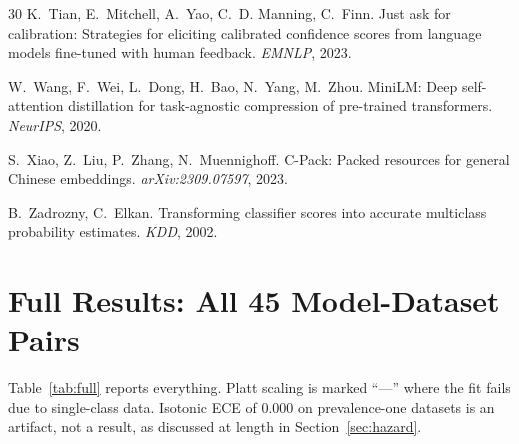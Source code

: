 \begin{thebibliography}{30}
 K.~Tian, E.~Mitchell, A.~Yao, C.~D. Manning, C.~Finn.
Just ask for calibration: Strategies for eliciting calibrated confidence scores
from language models fine-tuned with human feedback.
\emph{EMNLP}, 2023.

 W.~Wang, F.~Wei, L.~Dong, H.~Bao, N.~Yang, M.~Zhou.
MiniLM: Deep self-attention distillation for task-agnostic compression of
pre-trained transformers.
\emph{NeurIPS}, 2020.

 S.~Xiao, Z.~Liu, P.~Zhang, N.~Muennighoff.
C-Pack: Packed resources for general Chinese embeddings.
\emph{arXiv:2309.07597}, 2023.

 B.~Zadrozny, C.~Elkan.
Transforming classifier scores into accurate multiclass probability estimates.
\emph{KDD}, 2002.

\end{thebibliography}

\clearpage
\appendix
\section{Full Results: All 45 Model-Dataset Pairs}
\label{app:full}

Table~\ref{tab:full} reports everything. Platt scaling is marked ``---'' where the
fit fails due to single-class data. Isotonic ECE of 0.000 on prevalence-one datasets
is an artifact, not a result, as discussed at length in Section~\ref{sec:hazard}.

